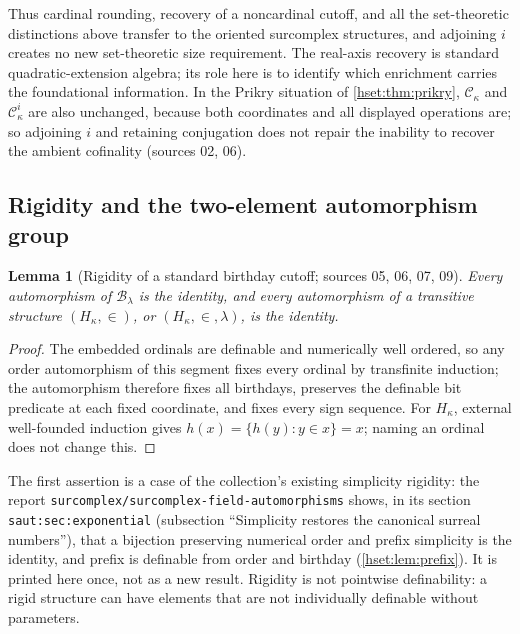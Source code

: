 \documentclass[11pt,letterpaper]{article}
\newtheorem{lemma}[lemma]{Lemma}\aliascntresetthe{lemma}
\theoremstyle{definition}
\theoremstyle{remark}
\newcommand{\B}{\mathcal B}
\newcommand{\C}{\mathcal C}
\newcommand{\lbl}[1]{\nolinkurl{#1}}
\newcommand{\repo}[1]{\nolinkurl{#1}}
\begin{document}
Thus cardinal rounding, recovery of a noncardinal cutoff, and all the
set-theoretic distinctions above transfer to the oriented surcomplex
structures, and adjoining $i$ creates no new set-theoretic size requirement.
The real-axis recovery is standard quadratic-extension algebra; its role here is
to identify which enrichment carries the foundational information. In the
Prikry situation of \cref{hset:thm:prikry}, $\C_\kappa$ and $\C^i_\kappa$ are also
unchanged, because both coordinates and all displayed operations are; so
adjoining $i$ and retaining conjugation does not repair the inability to recover
the ambient cofinality (sources 02, 06).

\subsection{Rigidity and the two-element automorphism group}

\begin{lemma}[Rigidity of a standard birthday cutoff; sources 05, 06, 07, 09]
\label{hset:lem:rigidity}
Every automorphism of $\B_\lambda$ is the identity, and every automorphism of a
transitive structure $(H_\kappa,\in)$, or $(H_\kappa,\in,\lambda)$, is the
identity.
\end{lemma}
\begin{proof}
The embedded ordinals are definable and numerically well ordered, so any order
automorphism of this segment fixes every ordinal by transfinite induction; the
automorphism therefore fixes all birthdays, preserves the definable bit
predicate at each fixed coordinate, and fixes every sign sequence. For
$H_\kappa$, external well-founded induction gives $h(x)=\{h(y):y\in x\}=x$;
naming an ordinal does not change this.
\end{proof}

The first assertion is a case of the collection's existing simplicity
rigidity: the report \repo{surcomplex/surcomplex-field-automorphisms} shows, in
its section \lbl{saut:sec:exponential} (subsection ``Simplicity restores the
canonical surreal numbers''), that a bijection preserving numerical order and
prefix simplicity is the identity, and prefix is definable from order and
birthday (\cref{hset:lem:prefix}). It is printed here once, not as a new result.
Rigidity is not pointwise definability: a rigid structure can have elements
that are not individually definable without parameters.
\end{document}
